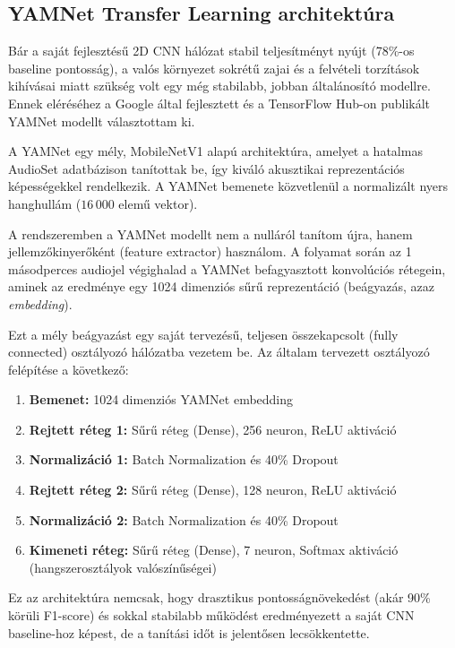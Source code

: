 \subsection{YAMNet Transfer Learning architektúra}
\label{subsec:yamnet_architecture}

Bár a saját fejlesztésű 2D CNN hálózat stabil teljesítményt nyújt (78\%-os baseline pontosság), a valós környezet sokrétű zajai és a felvételi torzítások kihívásai miatt szükség volt egy még stabilabb, jobban általánosító modellre. Ennek eléréséhez a Google által fejlesztett és a TensorFlow Hub-on publikált YAMNet modellt választottam ki. 

A YAMNet egy mély, MobileNetV1 alapú architektúra, amelyet a hatalmas AudioSet adatbázison tanítottak be, így kiváló akusztikai reprezentációs képességekkel rendelkezik. A YAMNet bemenete közvetlenül a normalizált nyers hanghullám ($16\,000$ elemű vektor).

A rendszeremben a YAMNet modellt nem a nulláról tanítom újra, hanem jellemzőkinyerőként (feature extractor) használom. A folyamat során az 1 másodperces audiojel végighalad a YAMNet befagyasztott konvolúciós rétegein, aminek az eredménye egy 1024 dimenziós sűrű reprezentáció (beágyazás, azaz \textit{embedding}). 

Ezt a mély beágyazást egy saját tervezésű, teljesen összekapcsolt (fully connected) osztályozó hálózatba vezetem be. Az általam tervezett osztályozó felépítése a következő:
\begin{enumerate}
  \item \textbf{Bemenet:} 1024 dimenziós YAMNet embedding
  \item \textbf{Rejtett réteg 1:} Sűrű réteg (Dense), 256 neuron, ReLU aktiváció
  \item \textbf{Normalizáció 1:} Batch Normalization és 40\% Dropout
  \item \textbf{Rejtett réteg 2:} Sűrű réteg (Dense), 128 neuron, ReLU aktiváció
  \item \textbf{Normalizáció 2:} Batch Normalization és 40\% Dropout
  \item \textbf{Kimeneti réteg:} Sűrű réteg (Dense), 7 neuron, Softmax aktiváció (hangszerosztályok valószínűségei)
\end{enumerate}

Ez az architektúra nemcsak, hogy drasztikus pontosságnövekedést (akár 90\% körüli F1-score) és sokkal stabilabb működést eredményezett a saját CNN baseline-hoz képest, de a tanítási időt is jelentősen lecsökkentette.

